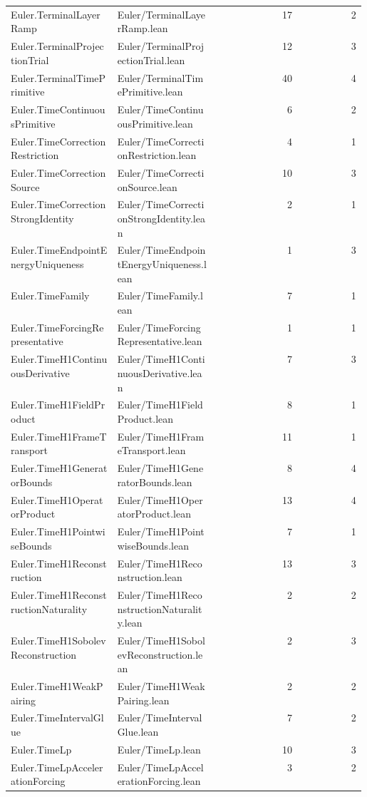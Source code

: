 \begin{longtable}{p{0.30\linewidth}p{0.28\linewidth}rr}
Euler.TerminalLayerRamp & Euler/TerminalLayerRamp.lean & 17 & 2\\
Euler.TerminalProjectionTrial & Euler/TerminalProjectionTrial.lean & 12 & 3\\
Euler.TerminalTimePrimitive & Euler/TerminalTimePrimitive.lean & 40 & 4\\
Euler.TimeContinuousPrimitive & Euler/TimeContinuousPrimitive.lean & 6 & 2\\
Euler.TimeCorrectionRestriction & Euler/TimeCorrectionRestriction.lean & 4 & 1\\
Euler.TimeCorrectionSource & Euler/TimeCorrectionSource.lean & 10 & 3\\
Euler.TimeCorrectionStrongIdentity & Euler/TimeCorrectionStrongIdentity.lean & 2 & 1\\
Euler.TimeEndpointEnergyUniqueness & Euler/TimeEndpointEnergyUniqueness.lean & 1 & 3\\
Euler.TimeFamily & Euler/TimeFamily.lean & 7 & 1\\
Euler.TimeForcingRepresentative & Euler/TimeForcingRepresentative.lean & 1 & 1\\
Euler.TimeH1ContinuousDerivative & Euler/TimeH1ContinuousDerivative.lean & 7 & 3\\
Euler.TimeH1FieldProduct & Euler/TimeH1FieldProduct.lean & 8 & 1\\
Euler.TimeH1FrameTransport & Euler/TimeH1FrameTransport.lean & 11 & 1\\
Euler.TimeH1GeneratorBounds & Euler/TimeH1GeneratorBounds.lean & 8 & 4\\
Euler.TimeH1OperatorProduct & Euler/TimeH1OperatorProduct.lean & 13 & 4\\
Euler.TimeH1PointwiseBounds & Euler/TimeH1PointwiseBounds.lean & 7 & 1\\
Euler.TimeH1Reconstruction & Euler/TimeH1Reconstruction.lean & 13 & 3\\
Euler.TimeH1ReconstructionNaturality & Euler/TimeH1ReconstructionNaturality.lean & 2 & 2\\
Euler.TimeH1SobolevReconstruction & Euler/TimeH1SobolevReconstruction.lean & 2 & 3\\
Euler.TimeH1WeakPairing & Euler/TimeH1WeakPairing.lean & 2 & 2\\
Euler.TimeIntervalGlue & Euler/TimeIntervalGlue.lean & 7 & 2\\
Euler.TimeLp & Euler/TimeLp.lean & 10 & 3\\
Euler.TimeLpAccelerationForcing & Euler/TimeLpAccelerationForcing.lean & 3 & 2\\

\end{longtable}
